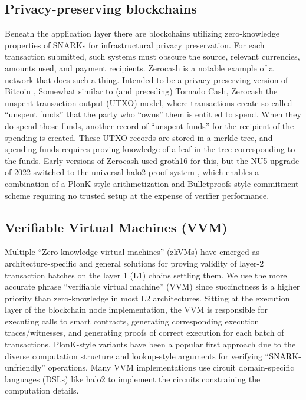 \subsection{Privacy-preserving blockchains}
\noindent Beneath the application layer there are blockchains utilizing zero-knowledge properties of SNARKs for infrastructural privacy preservation. For each transaction submitted, such systems must obscure the source, relevant currencies, amounts used, and payment recipients. Zerocash \cite{zcash} is a notable example of a network that does such a thing. Intended to be a privacy-preserving version of Bitcoin \cite{bitcoin}, Somewhat similar to (and preceding) Tornado Cash, Zerocash the unspent-transaction-output (UTXO) model, where transactions create so-called ``unspent funds'' that the party who ``owns'' them is entitled to spend. When they do spend those funds, another record of ``unspent funds'' for the recipient of the spending is created. These UTXO records are stored in a merkle tree, and spending funds requires proving knowledge of a leaf in the tree corresponding to the funds. Early versions of Zerocash used groth16 for this, but the NU5 upgrade of 2022 switched to the universal halo2 proof system \cite{halo2}, which enables a combination of a PlonK-style arithmetization and Bulletproofs-style commitment scheme \cite{bulletproofs} requiring no trusted setup at the expense of verifier performance.

\subsection{Verifiable Virtual Machines (VVM)}
\noindent Multiple ``Zero-knowledge virtual machines'' (zkVMs) \cite{scrollzkevm, polygonzkevm, sp1, risc0, openvm} have emerged as architecture-specific and general solutions for proving validity of layer-2 transaction batches on the layer 1 (L1) chains settling them. We use the more accurate phrase ``verifiable virtual machine'' (VVM) since succinctness is a higher priority than zero-knowledge in most L2 architectures. Sitting at the execution layer of the blockchain node implementation, the VVM is responsible for executing calls to smart contracts, generating corresponding execution traces/witnesses, and generating proofs of correct execution for each batch of transactions. PlonK-style variants have been a popular first approach due to the diverse computation structure and lookup-style arguments for verifying ``SNARK-unfriendly'' operations. Many VVM implementations use circuit domain-specific languages (DSLs) like halo2 to implement the circuits constraining the computation details. \\


